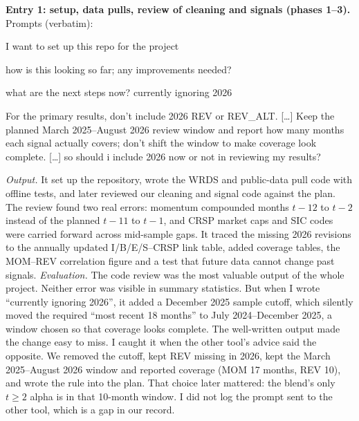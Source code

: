 \textbf{Entry 1: setup, data pulls, review of cleaning and signals (phases 1--3).} Prompts (verbatim):
\begin{promptbox}
 I want to set up this repo for the project

\medskip\noindent how is this looking so far; any improvements needed?

\medskip\noindent what are the next steps now? currently ignoring 2026

\medskip{} For the primary results, don't include 2026 REV or REV\_ALT. [\ldots] Keep the planned March 2025--August 2026 review window and report how many months each signal actually covers; don't shift the window to make coverage look complete. [\ldots] so should i include 2026 now or not in reviewing my results?
\end{promptbox}
\emph{Output.} It set up the repository, wrote the WRDS and public-data pull code with offline tests, and later reviewed our cleaning and signal code against the plan. The review found two real errors: momentum compounded months $t-12$ to $t-2$ instead of the planned $t-11$ to $t-1$, and CRSP market caps and SIC codes were carried forward across mid-sample gaps. It traced the missing 2026 revisions to the annually updated I/B/E/S--CRSP link table, added coverage tables, the MOM--REV correlation figure and a test that future data cannot change past signals. \emph{Evaluation.} The code review was the most valuable output of the whole project. Neither error was visible in summary statistics. But when I wrote ``currently ignoring 2026'', it added a December 2025 sample cutoff, which silently moved the required ``most recent 18 months'' to July 2024--December 2025, a window chosen so that coverage looks complete. The well-written output made the change easy to miss. I caught it when the other tool's advice said the opposite. We removed the cutoff, kept REV missing in 2026, kept the March 2025--August 2026 window and reported coverage (MOM 17 months, REV 10), and wrote the rule into the plan. That choice later mattered: the blend's only $t\geq2$ alpha is in that 10-month window. I did not log the prompt sent to the other tool, which is a gap in our record.

